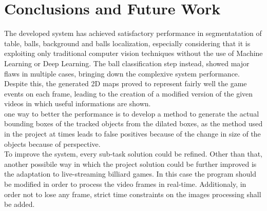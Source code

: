 \section{Conclusions and Future Work}


The developed system has achieved satisfactory performance in segmentatation of table, balls, background and balls localization, especially considering 
that it is exploiting only traditional computer vision techniques without the use of Machine Learning or Deep Learning.
The ball classification step instead, showed major flaws in multiple cases, bringing down the complexive system performance. 
Despite this, the generated 2D maps proved to represent fairly well the game events on each frame, leading to the creation of a modified version
of the given videos in which useful informations are shown. 
\newline \\
one way to better the performance is to develop a method to generate the actual bounding boxes
of the tracked objects from the dilated boxes, as the method used in the project at times leads
to false positives because of the change in size of the objects because of perspective.
\newline \\
To improve the system, every sub-task solution could be refined.
Other than that, another possibile way in which the project solution could be further improved is the adaptation to live-streaming billiard games. In this case the program should be modified
in order to process the video frames in real-time. Additionaly, in order not to lose any frame, strict time constraints on the images processing shall be added. 

